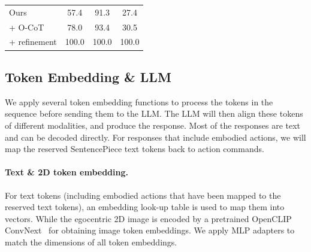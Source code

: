 \documentclass{article}
\begin{document}
\begin{table}[t!]
\begin{minipage}{0.33\linewidth}
{\begin{tabular}{lccc}
        \midrule
        Ours & 57.4 & 91.3 & 27.4 \\
        + O-CoT & 78.0 & 93.4 & 30.5 \\
        + refinement & 100.0 & 100.0 & 100.0 \\
        \bottomrule
    \end{tabular}
    }
    \label{tab:data_quality_statistics}
    \setlength\tabcolsep{3pt}
\end{minipage}
\vspace{-0.28em}
\end{table}


\subsection{Token Embedding \& LLM}

We apply several token embedding functions to process the tokens in the sequence before sending them to the LLM. The LLM will then align these tokens of different modalities, and produce the response. Most of the responses are text and can be decoded directly. For responses that include embodied actions, we will map the reserved SentencePiece text tokens back to action commands.

\paragraph{Text \& 2D token embedding.}  For text tokens (including embodied actions that have been mapped to the reserved text tokens), an embedding look-up table is used to map them into vectors. While the egocentric 2D image is encoded by a pretrained OpenCLIP ConvNext~\citep{liu2022convnet} for obtaining image token embeddings.
We apply MLP adapters to match the dimensions of all token embeddings.
\end{document}
